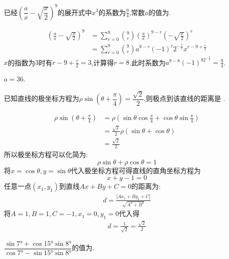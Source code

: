 \documentclass[answers]{exam}
\begin{document}
\begin{questions}
	\question 已经$\left( \dfrac{a}{x} -\sqrt{\dfrac{x}{2}}
		\right)^9$的展开式中$x^3$的系数为$\frac94$,常数$a$的值为\fillin[36][2cm].

	\begin{solution}
		\begin{align*}
			\left( \frac{a}{x} - \sqrt{\frac{x}{2}} \right)^9
			 & = \sum_{r=0}^9\binom{9}{r} \left( \frac{a}{x} \right)^{9-r} \left( -\sqrt{\frac{x}{2}} \right)^r \\
			 & = \sum_{r=0}^{9}\binom{9}{r} a^{9-r}(-1)^r2^{-\frac{r}{2}}x^{r-9 + \frac{r}{2}}
		\end{align*}
		$x$的指数为$3$时有$r-9+\frac{r}{2} = 3$,计算得$r=8$.此时系数为$a^{9-8}(-1)^82^{-\frac{8}{2}} = \frac94$.

		$a=36$.
	\end{solution}
	\question 已知直线的极坐标方程为$\rho\sin \left( \theta + \dfrac{\pi}{4} \right) =
		\dfrac{\sqrt{2}}{2}$,则极点到该直线的距离是 .

	\begin{solution}
		\begin{align*}
			\rho\sin \left( \theta + \frac{\pi}{4} \right)
			 & = \rho( \sin\theta\cos\frac{\pi}{4} + \cos\theta\sin\frac{\pi}{4}) \\
			 & =  \frac{\sqrt{2}}{2}\rho(\sin\theta + \cos\theta)                 \\
			 & = \frac{\sqrt{2}}{2}
		\end{align*}
		所以极坐标方程可以化简为:
		\begin{equation*}
			\rho\sin\theta + \rho\cos\theta = 1
		\end{equation*}
		将$x=\cos\theta, y=\sin\theta$代入极坐标方程可得直线的直角坐标方程为
		\begin{equation*}
			x + y - 1 = 0
		\end{equation*}
		任意一点$(x_1, y_1)$到直线$Ax+By+C=0$的距离为:
		\begin{align*}
			d = \frac{|Ax_1+By_1+C|}{\sqrt{A^2+B^2}}
		\end{align*}
		将$A=1,B=1,C=-1,x_1=0, y_1=0$代入得
		\begin{align*}
			d = \frac{1}{\sqrt{2}} = \frac{\sqrt{2}}{2}
		\end{align*}
	\end{solution}

	\question
	$\dfrac{\sin{\ang{7}}+\cos{\ang{15}}\sin{\ang{8}}}{\cos{\ang{7}}-\sin{\ang{15}}\sin{\ang{8}}}$的值为\fillin[$2-\sqrt{3}$][2cm].


\end{questions}
\end{document}
